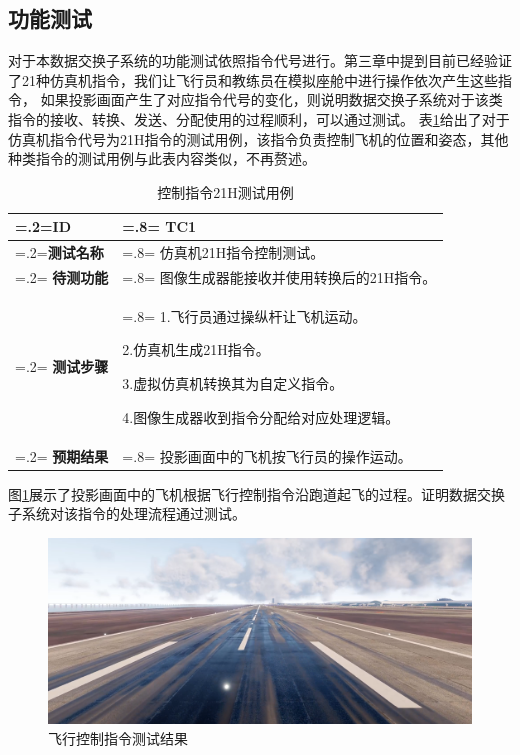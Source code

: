 \subsection{功能测试}
对于本数据交换子系统的功能测试依照指令代号进行。第三章中提到目前已经验证了21种仿真机指令，我们让飞行员和教练员在模拟座舱中进行操作依次产生这些指令，
如果投影画面产生了对应指令代号的变化，则说明数据交换子系统对于该类指令的接收、转换、发送、分配使用的过程顺利，可以通过测试。
表\ref{testcase}给出了对于仿真机指令代号为21H指令的测试用例，该指令负责控制飞机的位置和姿态，其他种类指令的测试用例与此表内容类似，不再赘述。
\begin{table}[h!]
    \begin{center}
        \caption{控制指令21H测试用例}
        \label{testcase}
        \renewcommand\arraystretch{1.5}
        \begin{tabularx}{0.8\textwidth}{ 
             >{\centering\arraybackslash\hsize=.2\hsize\linewidth=\hsize}X 
             >{\raggedright\arraybackslash\hsize=.8\hsize\linewidth=\hsize}X 
             }
             \hline
            \textbf{ID } & \textbf{TC1}\\
             \hline
             \textbf{测试名称} & 仿真机21H指令控制测试。\\
             \hline
             \textbf{待测功能} & 图像生成器能接收并使用转换后的21H指令。\\
             \hline
             \textbf{测试步骤} & 1.飞行员通过操纵杆让飞机运动。\par 2.仿真机生成21H指令。\par 3.虚拟仿真机转换其为自定义指令。\par 4.图像生成器收到指令分配给对应处理逻辑。  \\
             \hline
             \textbf{预期结果} & 投影画面中的飞机按飞行员的操作运动。\\
             \hline
            \end{tabularx}
    \end{center}
\end{table}
\par
图\ref{21test}展示了投影画面中的飞机根据飞行控制指令沿跑道起飞的过程。证明数据交换子系统对该指令的处理流程通过测试。
\begin{figure}[h!]
    \begin{center}
        \includegraphics[width=.9\textwidth]{pictures/firstcamera.png}
        \caption{飞行控制指令测试结果}
        \label{21test}
    \end{center}
\end{figure}
